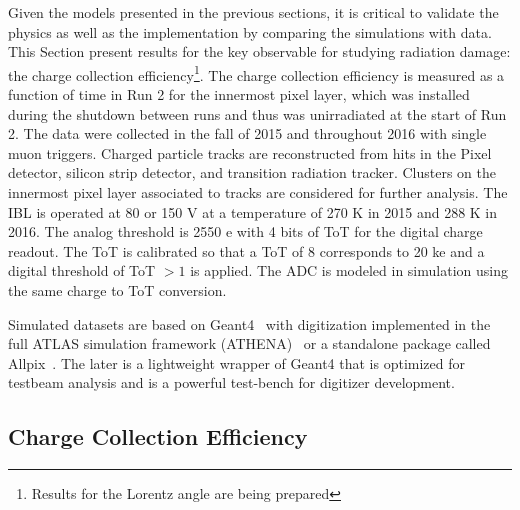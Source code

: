 Given the models presented in the previous sections, it is critical to validate the physics as well as the implementation by comparing the simulations with data.  This Section present results for the  key observable for studying radiation damage: the charge collection efficiency\footnote{Results for the Lorentz angle are being prepared}.  The charge collection efficiency is measured as a function of time in Run 2 for the innermost pixel layer, which was installed during the shutdown between runs and thus was unirradiated at the start of Run 2.  The data were collected in the fall of 2015 and throughout 2016 with single muon triggers.  Charged particle tracks are reconstructed from hits in the Pixel detector, silicon strip detector, and transition radiation tracker.  Clusters on the innermost pixel layer associated to tracks are considered for further analysis.  The IBL is operated at 80 or 150 V at a temperature of 270 K in 2015 and 288 K in 2016.  The analog threshold is 2550 e with 4 bits of ToT for the digital charge readout.  The ToT is calibrated so that a ToT of 8 corresponds to 20 ke and a digital threshold of ToT $>1$ is applied.  The ADC is modeled in simulation using the same charge to ToT conversion.

Simulated datasets are based on Geant4~\cite{Agostinelli:2002hh} with digitization implemented in the full ATLAS simulation framework (ATHENA)~\cite{Aad:2010ah} or a standalone package called Allpix~\cite{benoit:20xx}.  The later is a lightweight wrapper of Geant4 that is optimized for testbeam analysis and is a powerful test-bench for digitizer development.


\subsection{Charge Collection Efficiency}
\label{sec:CCE}

